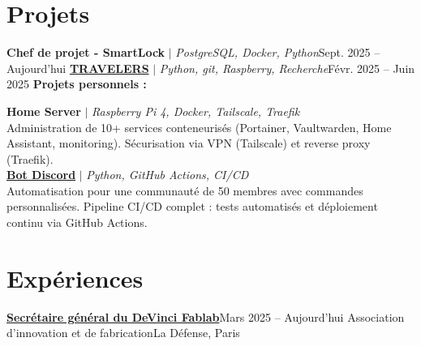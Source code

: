 \documentclass[letterpaper,11pt]{article}
\begin{document}

\section{Projets}
    \resumeSubHeadingListStart
      \resumeProjectHeading
          {{\textbf{Chef de projet - SmartLock}} $|$ \emph{PostgreSQL, Docker, Python}}{Sept. 2025 -- Aujourd'hui}
          \resumeItemListStart
          \resumeItemListEnd
      \resumeProjectHeading
          {\href{https://github.com/THE-TRAVELERS}{\textbf{TRAVELERS}} $|$ \emph{Python, git, Raspberry, Recherche}}{Févr. 2025 -- Juin 2025}
          \resumeItemListStart
          \resumeItemListEnd
    \resumeSubHeadingListEnd
    \textbf{Projets personnels :}
    \begin{itemize}[leftmargin=0.15in, label={}]
      \small{\item{
        \textbf{Home Server} $|$ \emph{Raspberry Pi 4, Docker, Tailscale, Traefik} \\
        Administration de 10+ services conteneurisés (Portainer, Vaultwarden, Home Assistant, monitoring). Sécurisation via VPN (Tailscale) et reverse proxy (Traefik). \\[0.5em]
        \textbf{\href{https://github.com/floshv1/floshy_bot}{Bot Discord}} $|$ \emph{Python, GitHub Actions, CI/CD} \\
        Automatisation pour une communauté de 50 membres avec commandes personnalisées. Pipeline CI/CD complet : tests automatisés et déploiement continu via GitHub Actions. \\[0.5em]
      }}
    \end{itemize}

\section{Expériences}
    \resumeSubHeadingListStart
      \resumeSubheading
        {\href{https://devinci-fablab.fr}{\textbf{Secrétaire général du DeVinci Fablab}}}{Mars 2025 -- Aujourd'hui}
        {Association d'innovation et de fabrication}{La Défense, Paris}
        \resumeItemListStart
      \resumeItemListEnd
    \resumeSubHeadingListEnd
\end{document}
